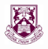 \documentclass[12pt]{article}
\begin{document}
		\hspace{2.8in}\includegraphics[width=0.7in]{images/shieldtransparent2}
		\examtitle
		
		
		
		\newpage 
		
		
		\pagestyle{fancy} \setcounter{page}{1}
		\renewcommand{\headrulewidth}{0.4pt}
		\renewcommand{\headsep}{20pt}
		\lhead{\modcode \quad \modtitle \qquad \examiner} \chead{}
		\rhead{\term \setlength{\unitlength}{\baselineskip}}
		
		
		
		
		\newpage
		
		
\end{document}

